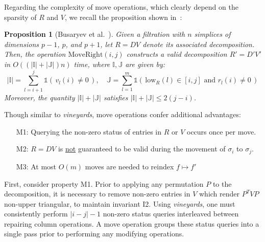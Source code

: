 \documentclass[sn-mathphys]{sn-jnl}
\newtheorem{proposition}{Proposition}
\newtheorem{remark}{Remark}
\begin{document}
Regarding the complexity of move operations, which clearly depend on the sparsity of $R$ and $V$, we recall the proposition shown in~\cite{busaryev2010tracking}: 
\begin{proposition}[Busaryev et al.~\cite{busaryev2010tracking}]\label{prop:move_st}
	Given a filtration with $n$ simplices of dimensions $p-1$, $p$, and $p+1$,    let $R = DV$ denote its associated decomposition. Then, the operation $\mathrm{MoveRight}(i,j)$ constructs a valid decomposition $R' = D'V'$ in $O((\lvert \mathbb{I} \rvert + \lvert \mathbb{J} \rvert)n)$ time, where $\mathbb{I}, \mathbb{J}$ are given by:
	$$ \lvert \mathbb{I}\rvert = \sum\limits_{l=i+1}^j \mathds{1}\left(\, v_l(i) \neq 0 \, \right), \quad \mathbb{J} = \sum\limits_{l=1}^m \mathds{1}\left(\, \mathrm{low}_R(l) \in [i,j] \text{ and } r_l(i) \neq 0 \, \right)$$
	Moreover, the quantity $\lvert \mathbb{I} \rvert + \lvert \mathbb{J} \rvert$ satisfies $\lvert \mathbb{I} \rvert + \lvert \mathbb{J} \rvert \leq 2(j - i)$. 
\end{proposition}
\noindent Though similar to \emph{vineyards}, move operations confer additional advantages:
\\	
 \begin{enumerate}[labelsep=5pt, topsep=0pt,itemsep=-0.25ex,parsep=1.2ex]
 	\item[M1:] Querying the non-zero status of entries in $R$ or $V$ occurs once per move.
 	\item[M2:] $R = D V$ is \underline{not} guaranteed to be valid during the movement of $\sigma_i $ to $ \sigma_j$.
 	\item[M3:] At most $O(m)$ moves are needed to reindex $f \mapsto f'$ 
 \end{enumerate} 
 \vspace*{1em}
First, consider property M1. Prior to applying any permutation $P$ to the decomposition, it is necessary to remove non-zero entries in $V$ which render $P^TVP$ non-upper triangular, to maintain invariant I2. 
Using \emph{vineyards}, one must consistently perform $\lvert i - j \rvert - 1$ non-zero status queries interleaved between repairing column operations. A move operation groups these status queries into a single pass prior to performing any modifying operations. 
\end{document}
